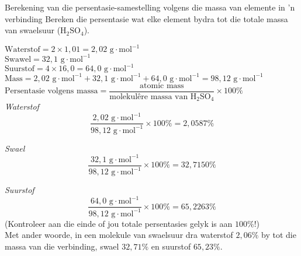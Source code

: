       \begin{wex}{Berekening van die persentasie-samestelling volgens die  massa van elemente in 'n verbinding}
{
Bereken die persentasie wat elke element bydra tot die totale massa van swaelsuur (${\text{H}}_{2}{\text{SO}}_{4}$).
      }
{
$\text{Waterstof}=2 \times 1,01 = 2,02 \text{ g} \cdot \text{mol}^{-1}$ \\ 
$\text{Swawel}=32,1 \text{ g} \cdot \text{mol}^{-1}$ \\
$\text{Suurstof}=4 \times 16,0 = 64,0 \text{ g} \cdot \text{mol}^{-1}$
$\text{Mass}=2,02 \text{ g} \cdot \text{mol}^{-1} + 32,1 \text{ g} \cdot \text{mol}^{-1} + 64,0 \text{ g} \cdot \text{mol}^{-1} = 98,12 \text{ g} \cdot \text{mol}^{-1}$
      \label{m38712*id280688}$\text{Persentasie volgens massa}=\dfrac{\text{atomic mass}}{\text{molekul\^{e}re massa van H}{}_{2}\text{SO}{}_{4}} \times 100\%$ \\

        \textsl{Waterstof}      
      \label{m38712*id280735}\nopagebreak\noindent{}        
    \begin{equation*}
    \frac{2,02 \text{ g} \cdot \text{mol}^{-1}}{98,12 \text{ g} \cdot \text{mol}^{-1}}\ensuremath{\times}100\%=2,0587\%
      \end{equation*}

        \textsl{Swael}      
      \label{m38712*id280786}\nopagebreak\noindent{}        
    \begin{equation*}
    \frac{32,1 \text{ g} \cdot \text{mol}^{-1}}{98,12 \text{ g} \cdot \text{mol}^{-1}}\ensuremath{\times}100\%=32,7150\%
      \end{equation*}

        \textsl{Suurstof}     
      \label{m38712*id280837}\nopagebreak\noindent{}
    \begin{equation*}
    \frac{64,0 \text{ g} \cdot \text{mol}^{-1}}{98,12 \text{ g} \cdot \text{mol}^{-1}}\ensuremath{\times}100\%=65,2263\%
      \end{equation*}
      \label{m38712*id280876}(Kontroleer aan die einde of jou totale persentasies gelyk is aan $100\%$!) \\
      \label{m38712*id280880}Met ander woorde, in een molekule van swaelsuur dra waterstof $2,06\%$ by tot die massa van die verbinding, swael $32,71\%$ en suurstof $65,23\%$. 
}
    \end{wex}

